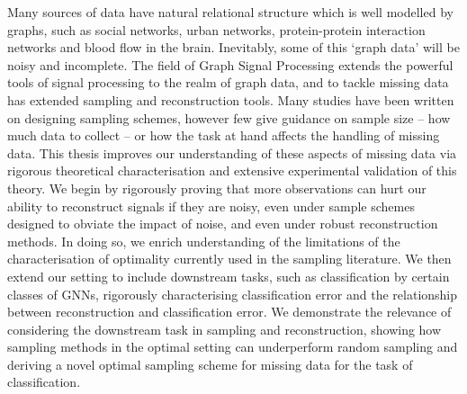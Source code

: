 

Many sources of data have natural relational structure which is well modelled by graphs, such as social networks, urban networks, protein-protein interaction networks and blood flow in the brain. Inevitably, some of this `graph data' will be noisy and incomplete. The field of Graph Signal Processing extends the powerful tools of signal processing to the realm of graph data, and to tackle missing data has extended sampling and reconstruction tools. Many studies have been written on designing sampling schemes, however few give guidance on sample size -- how much data to collect -- or how the task at hand affects the handling of missing data. This thesis improves our understanding of these aspects of missing data via rigorous theoretical characterisation and extensive experimental validation of this theory. We begin by rigorously proving that more observations can hurt our ability to reconstruct signals if they are noisy, even under sample schemes designed to obviate the impact of noise, and even under robust reconstruction methods. In doing so, we enrich understanding of the  limitations of the characterisation of optimality currently used in the sampling literature. We then extend our setting to include downstream tasks, such as classification by certain classes of GNNs, rigorously characterising classification error and the relationship between reconstruction and classification error. We demonstrate the relevance of considering the downstream task in sampling and reconstruction, showing how sampling methods in the optimal setting can underperform random sampling and deriving a novel optimal sampling scheme for missing data for the task of classification.
